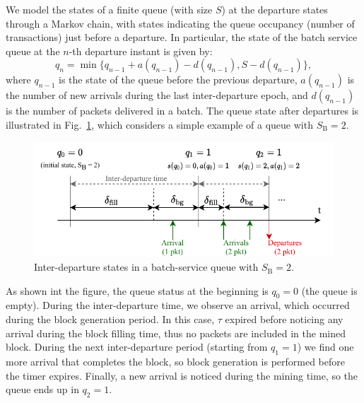 \documentclass[10pt,journal,compsoc]{IEEEtran}
\begin{document}
We model the states of a finite queue (with size $S$) at the departure states through a Markov chain, with states indicating the queue occupancy (number of transactions) just before a departure. In particular, the state of the batch service queue at the $n$-th departure instant is given by:
\begin{equation}
q_n = 
\min \Big\{ q_{n-1} + a(q_{n-1}) - d(q_{n-1}), S - d(q_{n-1}) \Big\},
\end{equation}
where $q_{n-1}$ is the state of the queue before the previous departure, $a(q_{n-1})$ is the number of new arrivals during the last inter-departure epoch, and $d(q_{n-1})$ is the number of packets delivered in a batch. The queue state after departures is illustrated in Fig.~\ref{fig:queue_arrivals_example}, which considers a simple example of a queue with $S_\text{B}=2$. 

\begin{figure}[ht!]
	\centering
	\includegraphics[width=\columnwidth]{img/queue_arrivals_example.pdf}
	\caption{Inter-departure states in a batch-service queue with $S_\text{B}=2$.}
	\label{fig:queue_arrivals_example}
\end{figure}

As shown int the figure, the queue status at the beginning is $q_0 = 0$ (the queue is empty). During the inter-departure time, we observe an arrival, which occurred during the block generation period. In this case, $\tau$ expired before noticing any arrival during the block filling time, thus no packets are included in the mined block. During the next inter-departure period (starting from $q_1 = 1$) we find one more arrival that completes the block, so block generation is performed before the timer expires. Finally, a new arrival is noticed during the mining time, so the queue ends up in $q_2 = 1$.
\end{document}

